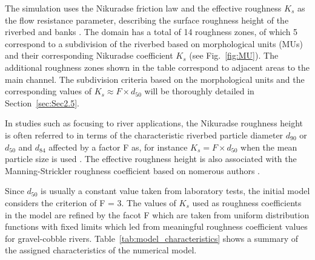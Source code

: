 \documentclass[draft,linenumbers,onecolumn]{agujournal2019} %
\begin{document}
The simulation uses the Nikuradse friction law and the effective roughness \(K_{s}\) as the flow resistance parameter, describing the surface roughness height of the riverbed and banks \cite{nikuradse1933stroemungsgesetze,marriott2010hydraulic,webber2018fluid,hervouet2020telemac2d}. The domain has a total of 14 roughness zones, of which 5 correspond to a subdivision of the riverbed based on morphological units (MUs) and their corresponding Nikuradse coefficient \(K_{s}\) (see Fig.~\ref{fig:MU}). The additional roughness zones shown in the table correspond to adjacent areas to the main channel. The subdivision criteria based on the morphological units and the corresponding values of \( K_{s} \approx F \times d_{50} \) will be thoroughly detailed in Section~\ref{sec:Sec2.5}.




In studies such as \cite{meyer-peter1948formulas, ferguson2007flow, rickenmann2011evaluation} focusing to river applications, the Nikuradse roughness height is often referred to in terms of the characteristic riverbed particle diameter \(d_{90}\) or \(d_{50}\) and \(d_{84}\) affected by a factor F as, for instance \( K_{s} = F \times d_{50} \) when the mean particle size is used \cite{meyer-peter1948formulas,tassi2023gaia}. The effective roughness height is also associated with the Manning-Strickler roughness coefficient based on nomerous authors \cite{meyer-peter1948formulas,smart1999coefficient,ferguson2007flow}.



Since \(d_{50}\) is usually a constant value taken from laboratory tests, the initial model considers the criterion of F = 3. The values of \(K_{s}\) used as roughness coefficients in the model are refined by the facot F which are taken from uniform distribution functions with fixed limits which led from meaningful roughness coefficient values for gravel-cobble rivers. Table~\ref{tab:model_characteristics} shows a summary of the assigned characteristics of the numerical model.
%
%
\end{document}
